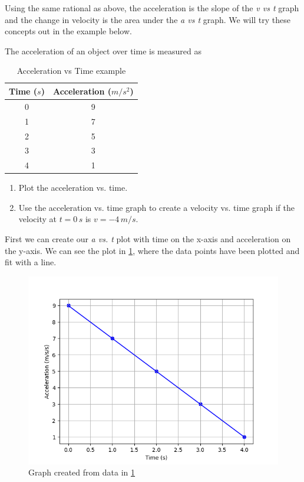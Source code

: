 \documentclass[12pt]{book}
\begin{document}
Using the same rational as above, the acceleration is the slope of the \textit{v vs t} graph and the change in velocity is the area under the \textit{a vs t} graph. We will try these concepts out in the example below.

\begin{exampleblock}

The acceleration of an object over time is measured as

\begin{table}[h]
\large
\centering
\caption{Acceleration vs Time example}
\begin{tabular}{| c | c |}
	\hline
	Time ($s$) & Acceleration ($m/s^2$) \\
	\hline
	0 & 9 \\ \hline
	1 & 7 \\ \hline
	2 & 5 \\ \hline
	3 & 3 \\ \hline
	4 & 1 \\ 
	\hline
\end{tabular}
\label{atable_ex1}
\end{table}

\begin{enumerate}
\item Plot the acceleration vs. time.
\item Use the acceleration vs. time graph to create a velocity vs. time graph if the velocity at $t = 0 \, s$ is $v = -4 \, m/s$.
\end{enumerate}

First we can create our \textit{a vs. t} plot with time on the x-axis and acceleration on the y-axis. We can see the plot in \ref{atable_motiongraph_ex1}, where the data points have been plotted and fit with a line.

\begin{figure}[h]
\centering
\includegraphics[scale=0.6]{example_accel.png}
\caption{Graph created from data in \ref{atable_ex1}}
\label{atable_motiongraph_ex1}
\end{figure}


\end{exampleblock}
\end{document}
